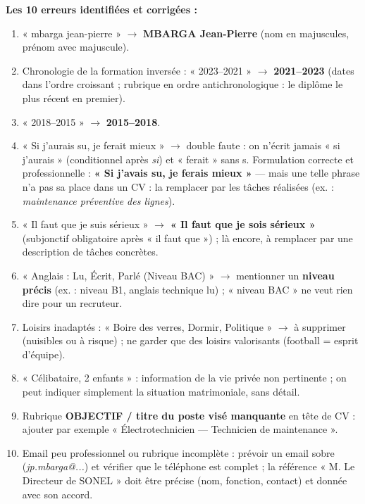 \documentclass[11pt]{article}
\begin{document}
\begin{corrige}
\textbf{Les 10 erreurs identifiées et corrigées :}
\begin{enumerate}
\item « mbarga jean-pierre » $\to$ \textbf{MBARGA Jean-Pierre} (nom en majuscules, prénom avec majuscule).
\item Chronologie de la formation inversée : « 2023--2021 » $\to$ \textbf{2021--2023} (dates dans l'ordre croissant ; rubrique en ordre antichronologique : le diplôme le plus récent en premier).
\item « 2018--2015 » $\to$ \textbf{2015--2018}.
\item « Si j'aurais su, je ferait mieux » $\to$ double faute : on n'écrit jamais « si j'aurais » (conditionnel après \emph{si}) et « ferait » sans s. Formulation correcte et professionnelle : \textbf{« Si j'avais su, je ferais mieux »} — mais une telle phrase n'a pas sa place dans un CV : la remplacer par les tâches réalisées (ex. : \emph{maintenance préventive des lignes}).
\item « Il faut que je suis sérieux » $\to$ \textbf{« Il faut que je sois sérieux »} (subjonctif obligatoire après « il faut que ») ; là encore, à remplacer par une description de tâches concrètes.
\item « Anglais : Lu, Écrit, Parlé (Niveau BAC) » $\to$ mentionner un \textbf{niveau précis} (ex. : niveau B1, anglais technique lu) ; « niveau BAC » ne veut rien dire pour un recruteur.
\item Loisirs inadaptés : « Boire des verres, Dormir, Politique » $\to$ à supprimer (nuisibles ou à risque) ; ne garder que des loisirs valorisants (football = esprit d'équipe).
\item « Célibataire, 2 enfants » : information de la vie privée non pertinente ; on peut indiquer simplement la situation matrimoniale, sans détail.
\item Rubrique \textbf{OBJECTIF / titre du poste visé manquante} en tête de CV : ajouter par exemple « Électrotechnicien — Technicien de maintenance ».
\item Email peu professionnel ou rubrique incomplète : prévoir un email sobre (\emph{jp.mbarga@...}) et vérifier que le téléphone est complet ; la référence « M. Le Directeur de SONEL » doit être précise (nom, fonction, contact) et donnée avec son accord.
\end{enumerate}


\end{corrige}
\end{document}
